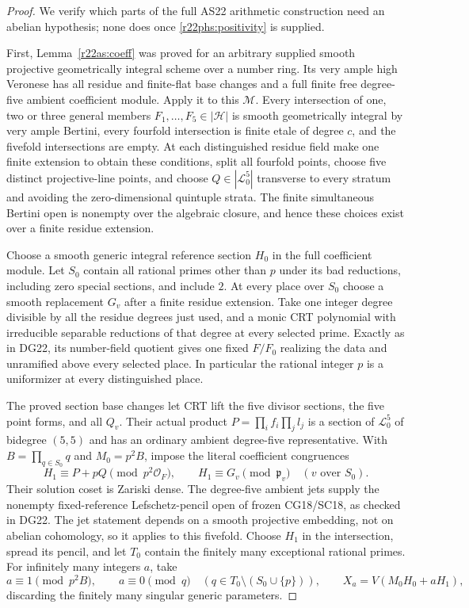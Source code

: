\begin{proof}
We verify which parts of the full AS22
arithmetic construction need an abelian
hypothesis; none does once
\eqref{r22phs:positivity} is supplied.

First, Lemma~\ref{r22as:coeff} was proved
for an arbitrary supplied smooth projective
geometrically integral scheme over a number
ring.  Its very ample high Veronese has
all residue and finite-flat base changes
and a full finite free degree-five
ambient coefficient module.  Apply it
to this $\mathcal M$.  Every intersection
of one, two or three general members
$F_1,\ldots,F_5\in|\mathcal H|$ is smooth
geometrically integral by very ample
Bertini, every fourfold intersection is
finite etale of degree $c$, and the
fivefold intersections are empty.  At
each distinguished residue field make
one finite extension to obtain these
conditions, split all fourfold points,
choose five distinct projective-line
points, and choose $Q\in|\mathcal L_0^5|$
transverse to every stratum and avoiding
the zero-dimensional quintuple strata.
The finite simultaneous Bertini open
is nonempty over the algebraic closure,
and hence these choices exist over a
finite residue extension.

Choose a smooth generic integral
reference section $H_0$ in the full
coefficient module.  Let $S_0$ contain
all rational primes other than $p$
under its bad reductions, including
zero special sections, and include $2$.
At every place over $S_0$ choose a
smooth replacement $G_v$ after a
finite residue extension.  Take one
integer degree divisible by all the
residue degrees just used, and a monic
CRT polynomial with irreducible
separable reductions of that degree
at every selected prime.  Exactly
as in DG22, its number-field quotient
gives one fixed $F/F_0$ realizing the
data and unramified above every
selected place.  In particular the
rational integer $p$ is a uniformizer
at every distinguished place.

The proved section base changes let
CRT lift the five divisor sections,
the five point forms, and all $Q_v$.
Their actual product
$P=\prod_i f_i\prod_j l_j$ is a
section of $\mathcal L_0^5$ of
bidegree $(5,5)$ and has an ordinary
ambient degree-five representative.
With $B=\prod_{q\in S_0}q$ and
$M_0=p^2B$, impose the literal
coefficient congruences
\[
 H_1\equiv P+pQ\pmod{p^2\mathcal O_F},
 \qquad
 H_1\equiv G_v\pmod{\mathfrak p_v}
                             \quad(v\text{ over }S_0).
 \tag{PSH22.3}\label{r22phs:CRT}
\]
Their solution coset is Zariski
dense.  The degree-five ambient
jets supply the nonempty
fixed-reference Lefschetz-pencil
open of frozen CG18/SC18, as
checked in DG22.  The jet statement
depends on a smooth projective
embedding, not on abelian
cohomology, so it applies to this
fivefold.  Choose $H_1$ in the
intersection, spread its pencil,
and let $T_0$ contain the finitely
many exceptional rational primes.
For infinitely many integers $a$,
take
\[
 a\equiv1\pmod{p^2B},\qquad
 a\equiv0\pmod q
          \quad(q\in T_0\setminus(S_0\cup\{p\})),
 \qquad X_a=V(M_0H_0+aH_1),
 \tag{PSH22.4}\label{r22phs:parameters}
\]
discarding the finitely many
singular generic parameters.


\end{proof}
